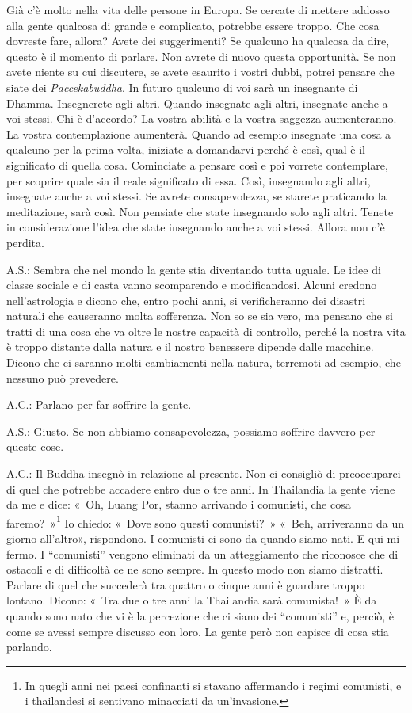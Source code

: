 Già c'è molto nella vita delle persone in Europa. Se cercate di mettere
addosso alla gente qualcosa di grande e complicato, potrebbe essere
troppo. Che cosa dovreste fare, allora? Avete dei suggerimenti? Se
qualcuno ha qualcosa da dire, questo è il momento di parlare. Non avrete
di nuovo questa opportunità. Se non avete niente su cui discutere, se
avete esaurito i vostri dubbi, potrei pensare che siate dei
\emph{Paccekabuddha}. In futuro qualcuno di voi sarà un insegnante di
Dhamma. Insegnerete agli altri. Quando insegnate agli altri, insegnate
anche a voi stessi. Chi è d'accordo? La vostra abilità e la vostra
saggezza aumenteranno. La vostra contemplazione aumenterà. Quando ad
esempio insegnate una cosa a qualcuno per la prima volta, iniziate a
domandarvi perché è così, qual è il significato di quella cosa.
Cominciate a pensare così e poi vorrete contemplare, per scoprire quale
sia il reale significato di essa. Così, insegnando agli altri, insegnate
anche a voi stessi. Se avrete consapevolezza, se starete praticando la
meditazione, sarà così. Non pensiate che state insegnando solo agli
altri. Tenete in considerazione l'idea che state insegnando anche a voi
stessi. Allora non c'è perdita.

A.S.: Sembra che nel mondo la gente stia diventando tutta uguale. Le
idee di classe sociale e di casta vanno scomparendo e modificandosi.
Alcuni credono nell'astrologia e dicono che, entro pochi anni, si
verificheranno dei disastri naturali che causeranno molta sofferenza.
Non so se sia vero, ma pensano che si tratti di una cosa che va oltre le
nostre capacità di controllo, perché la nostra vita è troppo distante
dalla natura e il nostro benessere dipende dalle macchine. Dicono che ci
saranno molti cambiamenti nella natura, terremoti ad esempio, che
nessuno può prevedere.

A.C.: Parlano per far soffrire la gente.

A.S.: Giusto. Se non abbiamo consapevolezza, possiamo soffrire davvero
per queste cose.

A.C.: Il Buddha insegnò in relazione al presente. Non ci consigliò di
preoccuparci di quel che potrebbe accadere entro due o tre anni. In
Thailandia la gente viene da me e dice: «~Oh, Luang Por, stanno
arrivando i comunisti, che cosa faremo?~»\footnote{In quegli anni nei
  paesi confinanti si stavano affermando i regimi comunisti, e i
  thailandesi si sentivano minacciati da un'invasione.} Io chiedo:
«~Dove sono questi comunisti?~» «~Beh, arriveranno da un giorno
all'altro», rispondono. I comunisti ci sono da quando siamo nati. E qui
mi fermo. I ``comunisti'' vengono eliminati da un atteggiamento che
riconosce che di ostacoli e di difficoltà ce ne sono sempre. In questo
modo non siamo distratti. Parlare di quel che succederà tra quattro o
cinque anni è guardare troppo lontano. Dicono: «~Tra due o tre anni la
Thailandia sarà comunista!~» È da quando sono nato che vi è la
percezione che ci siano dei ``comunisti'' e, perciò, è come se avessi
sempre discusso con loro. La gente però non capisce di cosa stia
parlando.

